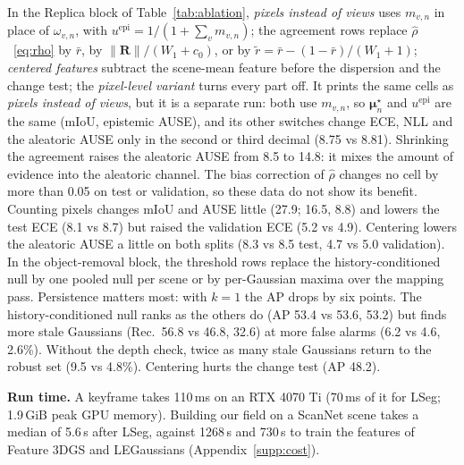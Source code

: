 \documentclass[journal]{IEEEtran}
\newcommand{\R}{\mathbf{R}}
\newcommand{\muv}{\boldsymbol{\mu}}
\begin{document}
In the Replica block of Table~\ref{tab:ablation}, \emph{pixels instead of views} uses $m_{v,n}$ in place of $\omega_{v,n}$, with $u^{\mathrm{epi}}=1/(1+\sum_v m_{v,n})$; the agreement rows replace $\hat\rho$~\eqref{eq:rho} by $\bar r$, by $\lVert\R\rVert/(W_1+c_0)$, or by $\tilde r=\bar r-(1-\bar r)/(W_1+1)$; \emph{centered features} subtract the scene-mean feature before the dispersion and the change test; the \emph{pixel-level variant} turns every part off. It prints the same cells as \emph{pixels instead of views}, but it is a separate run: both use $m_{v,n}$, so $\muv^\star_n$ and $u^{\mathrm{epi}}$ are the same (mIoU, epistemic AUSE), and its other switches change ECE, NLL and the aleatoric AUSE only in the second or third decimal (8.75 vs 8.81). Shrinking the agreement raises the aleatoric AUSE from 8.5 to 14.8: it mixes the amount of evidence into the aleatoric channel. The bias correction of $\hat\rho$ changes no cell by more than 0.05 on test or validation, so these data do not show its benefit. Counting pixels changes mIoU and AUSE little (27.9; 16.5, 8.8) and lowers the test ECE (8.1 vs 8.7) but raised the validation ECE (5.2 vs 4.9). Centering lowers the aleatoric AUSE a little on both splits (8.3 vs 8.5 test, 4.7 vs 5.0 validation). In the object-removal block, the threshold rows replace the history-conditioned null by one pooled null per scene or by per-Gaussian maxima over the mapping pass. Persistence matters most: with $k=1$ the AP drops by six points. The history-conditioned null ranks as the others do (AP 53.4 vs 53.6, 53.2) but finds more stale Gaussians (Rec.\ 56.8 vs 46.8, 32.6) at more false alarms (6.2 vs 4.6, 2.6\%). Without the depth check, twice as many stale Gaussians return to the robust set (9.5 vs 4.8\%). Centering hurts the change test (AP 48.2).

\textbf{Run time.} A keyframe takes 110\,ms on an RTX 4070 Ti (70\,ms of it for LSeg; 1.9\,GiB peak GPU memory). Building our field on a ScanNet scene takes a median of 5.6\,s after LSeg, against 1268\,s and 730\,s to train the features of Feature 3DGS and LEGaussians (Appendix~\ref{supp:cost}).


\end{document}
